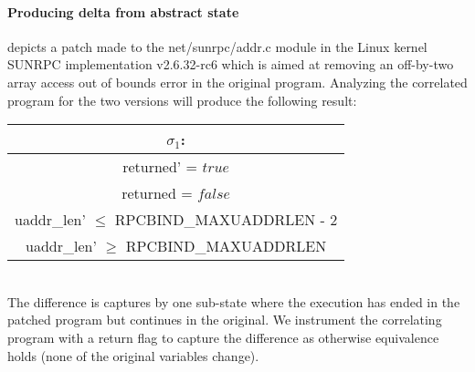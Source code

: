
\paragraph{Producing delta from abstract state}



 depicts a patch made to the net/sunrpc/addr.c module in the Linux kernel SUNRPC implementation v2.6.32-rc6 which is aimed at removing an off-by-two array access out of bounds error in the original program.  Analyzing the correlated program for the two versions will produce the following result: 
\\
\begin{tabular}{c}
$\sigma_1$:
\\ \hline
returned' = $true$
\\
returned = $false$
\\
uaddr\_len' $\leq$ RPCBIND\_MAXUADDRLEN - 2
\\
uaddr\_len' $\geq$ RPCBIND\_MAXUADDRLEN
\\ \hline
\end{tabular}
\\
The difference is captures by one sub-state where the execution has ended in the patched program but continues in the original. We instrument the correlating program with a return flag to capture the difference as otherwise equivalence holds (none of the original variables change).

